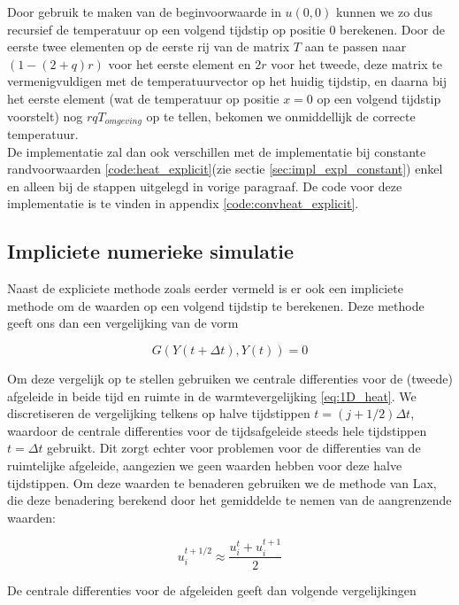\documentclass[a4paper,kulak]{kulakarticle} %
\begin{document}
Door gebruik te maken van de beginvoorwaarde in $u(0, 0)$ kunnen we zo dus recursief de temperatuur op een volgend tijdstip op positie 0 berekenen. Door de eerste twee elementen op de eerste rij van de matrix $T$ aan te passen naar $(1 - (2 + q)r)$ voor het eerste element en $2r$ voor het tweede, deze matrix te vermenigvuldigen met de temperatuurvector op het huidig tijdstip, en daarna bij het eerste element (wat de temperatuur op positie $x = 0$ op een volgend tijdstip voorstelt) nog $r q T_{omgeving}$ op te tellen, bekomen we onmiddellijk de correcte temperatuur. \\
De implementatie zal dan ook verschillen met de implementatie bij constante randvoorwaarden \ref{code:heat_explicit}(zie sectie \ref{sec:impl_expl_constant}) enkel en alleen bij de stappen uitgelegd in vorige paragraaf. De code voor deze implementatie is te vinden in appendix \ref{code:convheat_explicit}.

\subsection{Impliciete numerieke simulatie}

Naast de expliciete methode zoals eerder vermeld is er ook een impliciete methode om de waarden op een volgend tijdstip te berekenen. Deze methode geeft ons dan een vergelijking van de vorm

\begin{equation*}
	G(Y(t + \Delta t), Y(t)) = 0
\end{equation*}

Om deze vergelijk op te stellen gebruiken we centrale differenties voor de (tweede) afgeleide in beide tijd en ruimte in de warmtevergelijking \ref{eq:1D_heat}. We discretiseren de vergelijking telkens op halve tijdstippen $t = (j + 1/2) \Delta t$, waardoor de centrale differenties voor de tijdsafgeleide steeds hele tijdstippen $t = \Delta t$ gebruikt. Dit zorgt echter voor problemen voor de differenties van de ruimtelijke afgeleide, aangezien we geen waarden hebben voor deze halve tijdstippen. Om deze waarden te benaderen gebruiken we de methode van Lax, die deze benadering berekend door het gemiddelde te nemen van de aangrenzende waarden:

\begin{equation}
	u_i^{t + 1/2} \approx \frac{u_i^t + u_i^{t + 1}}{2}
	\label{eq:lax_method}
\end{equation}

De centrale differenties voor de afgeleiden geeft dan volgende vergelijkingen
\end{document}
